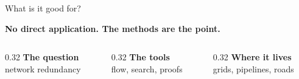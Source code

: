 \documentclass[aspectratio=1610,11pt]{beamer}
\begin{document}
\begin{frame}{What is it good for?}
\vfill
\begin{center}{\large\color{KULblauw3b}\bfseries No direct application. The methods are the point.}\end{center}
\vfill
\begin{columns}[t,onlytextwidth]
  \begin{column}{0.32\textwidth}\centering
    {\bfseries\color{KULblauw1}The question}\\[8pt]
    {\color{black!75}network redundancy}
  \end{column}
  \begin{column}{0.32\textwidth}\centering
    {\bfseries\color{KULblauw1}The tools}\\[8pt]
    {\color{black!75}flow, search, proofs}
  \end{column}
  \begin{column}{0.32\textwidth}\centering
    {\bfseries\color{KULblauw1}Where it lives}\\[8pt]
    {\color{black!75}grids, pipelines, roads}
  \end{column}
\end{columns}
\vfill
\end{frame}
\end{document}
